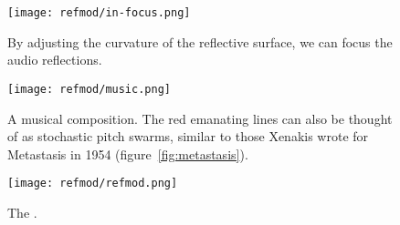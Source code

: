 \begin{figure}[]
  \texttt{[image: refmod/in-focus.png]}
  \caption[]{By adjusting the curvature of the reflective surface, we
    can focus the audio reflections.}
  \label{fig:refmod-good-focus}
\end{figure}

\begin{figure}[]
  \texttt{[image: refmod/music.png]}
  \caption[]{A musical composition. The red emanating lines can also
    be thought of as stochastic pitch swarms, similar to those Xenakis
    wrote for Metastasis in 1954 (figure~\ref{fig:metastasis}).}
  \label{fig:refmod-music}
\end{figure}


\begin{figure*}[]
  \texttt{[image: refmod/refmod.png]}
  \caption[]{The .}
  \label{fig:refmod-full}
\end{figure*}


